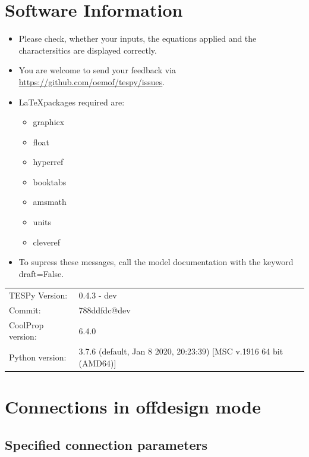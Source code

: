 \section*{Software Information}

\begin{itemize}
\item Please check, whether your inputs, the equations applied and the charactersitics are displayed correctly.
\item You are welcome to send your feedback via \url{https://github.com/oemof/tespy/issues}.
\item \LaTeX packages required are:
\begin{itemize}
\item graphicx
\item float
\item hyperref
\item booktabs
\item amsmath
\item units
\item cleveref
\end{itemize}
\item To supress these messages, call the model documentation with the keyword draft=False.
\end{itemize}

\begin{table}[H]
\begin{tabular}{ll}
TESPy Version:&0.4.3 - dev\\
Commit:&788ddfdc@dev\\
CoolProp version:&6.4.0\\
Python version:&3.7.6 (default, Jan  8 2020, 20:23:39) [MSC v.1916 64 bit (AMD64)]\\
\end{tabular}
\end{table}
\newpage\section{Connections in offdesign mode}

\subsection{Specified connection parameters}

